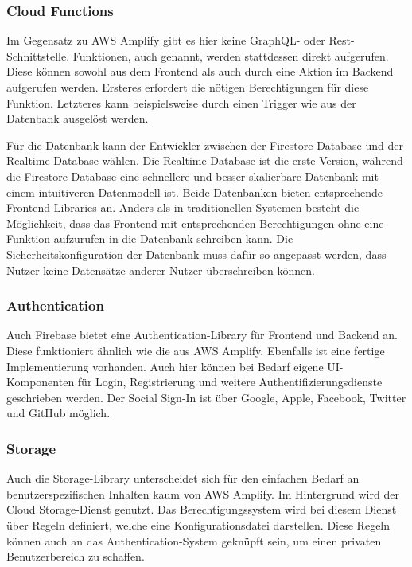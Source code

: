 \begin{itemize}
\subsubsection{Cloud Functions}

Im Gegensatz zu \ac{AWS} Amplify gibt es hier keine GraphQL- oder Rest-Schnittstelle. Funktionen, auch  genannt, werden stattdessen direkt aufgerufen. Diese können sowohl aus dem Frontend als auch durch eine Aktion im Backend aufgerufen werden. Ersteres erfordert die nötigen Berechtigungen für diese Funktion. Letzteres kann beispielsweise durch einen Trigger wie  aus der Datenbank ausgelöst werden.

Für die Datenbank kann der Entwickler zwischen der Firestore Database und der Realtime Database wählen. Die Realtime Database ist die erste Version, während die Firestore Database eine schnellere und besser skalierbare Datenbank mit einem intuitiveren Datenmodell ist. Beide Datenbanken bieten entsprechende Frontend-Libraries an. Anders als in traditionellen Systemen besteht die Möglichkeit, dass das Frontend mit entsprechenden Berechtigungen ohne eine Funktion aufzurufen in die Datenbank schreiben kann. Die Sicherheitskonfiguration der Datenbank muss dafür so angepasst werden, dass Nutzer keine Datensätze anderer Nutzer überschreiben können.

\subsubsection{Authentication}

Auch Firebase bietet eine Authentication-Library für Frontend und Backend an. Diese funktioniert ähnlich wie die aus \ac{AWS} Amplify. Ebenfalls ist eine fertige Implementierung vorhanden. Auch hier können bei Bedarf eigene UI-Komponenten für Login, Registrierung und weitere Authentifizierungsdienste geschrieben werden. Der Social Sign-In ist über Google, Apple, Facebook, Twitter und GitHub möglich.

\subsubsection{Storage}

Auch die Storage-Library unterscheidet sich für den einfachen Bedarf an benutzerspezifischen Inhalten kaum von \ac{AWS} Amplify. Im Hintergrund wird der Cloud Storage-Dienst genutzt. Das Berechtigungssystem wird bei diesem Dienst über Regeln definiert, welche eine Konfigurationsdatei darstellen. Diese Regeln können auch an das Authentication-System geknüpft sein, um einen privaten Benutzerbereich zu schaffen.


\end{itemize}
